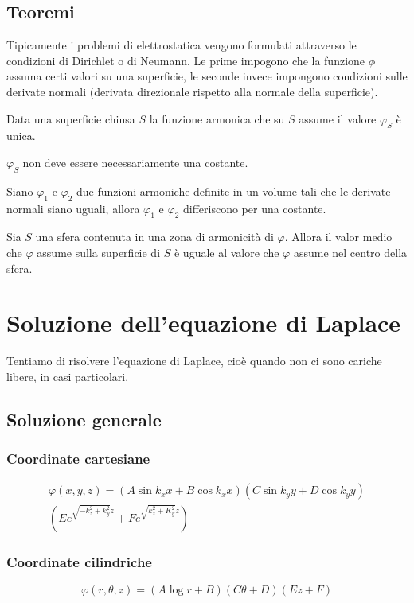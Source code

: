 \subsection{Teoremi}
Tipicamente i problemi di elettrostatica vengono formulati attraverso le condizioni di Dirichlet o di Neumann. Le prime impogono che la funzione $\phi$ assuma certi valori su una superficie, le seconde invece impongono condizioni sulle derivate normali (derivata direzionale rispetto alla normale della superficie).
\begin{Teo}
Data una superficie chiusa $S$ la funzione armonica che su $S$ assume il valore $\varphi_S$ è unica.
\end{Teo}
$\varphi_S$ non deve essere necessariamente una costante.
\begin{Teo}
Siano $\varphi_1$ e $\varphi_2$ due funzioni armoniche definite in un volume tali che le derivate normali siano uguali, allora $\varphi_1$ e $\varphi_2$ differiscono per una costante.
\end{Teo}
\begin{Teo}[media]
Sia $S$ una sfera contenuta in una zona di armonicità di $\varphi$. Allora il valor medio che $\varphi$ assume sulla superficie di $S$ è uguale al valore che $\varphi$ assume nel centro della sfera.
\end{Teo}
\section{Soluzione dell'equazione di Laplace}
Tentiamo di risolvere l'equazione di Laplace, cioè quando non ci sono cariche libere, in casi particolari.
\subsection{Soluzione generale}
\subsubsection{Coordinate cartesiane}
\begin{multline}
\varphi(x,y,z)=\left(A\sin k_x x+B\cos k_x x\right)\left(C\sin k_y y+D\cos k_y y\right)\\\left(Ee^{\sqrt{-k_z^2+k_y^2}z}+Fe^{\sqrt{k_z^2+K_y^2}z}\right)
\end{multline}
\subsubsection{Coordinate cilindriche}
\begin{equation}
\varphi(r,\theta,z)=\left(A\log r+B\right)\left(C\theta+D\right)\left(Ez+F\right)
\end{equation}
